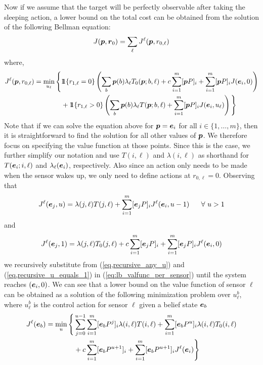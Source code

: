 \documentclass[journal,draftcls,onecolumn,11pt]{IEEEtran}
\newcommand{\emb}[1]{\text{\boldmath{$#1$}}}
\newcommand{\indic}[1]{\mbox{$1\!\!1$}{\{#1\}}}
\begin{document}
Now if we assume that the target will be perfectly observable after taking the sleeping action, a lower bound on the total cost can be obtained from the solution of the following Bellman equation:
\begin{equation}
J(\emb{p},\emb{r}_0) = \sum_{\ell} J^{\ell}(\emb{p},r_{0,\ell})
\label{eq,decomposed_valfunc}
\end{equation}
where,
\begin{align}
J^{\ell}(\emb{p},r_{0,\ell})=\min_{u_{\ell}}\Bigg\{&\indic{r_{1,\ell}=0}\left(\sum_b \emb{p}(b)\lambda_{\ell}T_0(\emb{p};b,\ell)+c\sum_{i=1}^m [\emb{p}P]_i + \sum_{i=1}^m [\emb{p}P]_i J(\emb{e}_i,0)\right)\nonumber\\
&+\indic{r_{1,\ell}>0}\left(\sum_b \emb{p}(b)\lambda_{\ell}T(\emb{p};b,\ell)+\sum_{i=1}^m [\emb{p}P]_i J(\emb{e}_i,u_{\ell})\right)\Bigg\}
\label{eq:lb_valfunc_per_sensor}
\end{align}
Note that if we can solve the equation above for $\emb{p}=\emb{e}_i$ for all $i\in\{1,\ldots,m\}$, then it is straightforward to find the solution for all other values of $\emb{p}$. We therefore focus on specifying the value function at those points. Since this is the case, we further simplify our notation and use $T(i,\ell)$ and $\lambda(i,\ell)$ as shorthand for $T(\emb{e}_i;i,\ell)$ and $\lambda_{\ell}(\emb{e}_i)$, respectively. Also since an action only needs to be made when the sensor wakes up, we only need to define actions at $r_{0,\ell}=0$. Observing that
\begin{eqnarray}
J^{\ell}(\emb{e}_j,u)= \lambda(j,\ell)T(j,\ell)+ \sum_{i=1}^m [\emb{e}_jP]_i J^{\ell}(\emb{e}_i,u-1)~~~~~\forall~u>1
\label{eq,recursive_any_u}
\end{eqnarray}
and
\begin{eqnarray}
J^{\ell}(\emb{e}_j,1)= \lambda(j,\ell)T_0(j,\ell)+ c\sum_{i=1}^m [\emb{e}_jP]_i+\sum_{i=1}^m [\emb{e}_jP]_i J^{\ell}(\emb{e}_i,0)
\label{eq,recursive_u_equals_1}
\end{eqnarray}
we recursively substitute from (\ref{eq,recursive_any_u}) and (\ref{eq,recursive_u_equals_1}) in (\ref{eq:lb_valfunc_per_sensor}) until the system reaches $(\emb{e}_i,0)$. We can see that a lower bound on the value function of sensor $\ell$ can be obtained as a solution of the following minimization problem over $u_{\ell}^b$, where $u_{\ell}^b$ is the control action for sensor $\ell$ given a belief state $\emb{e}_b$
\begin{align}
J^{\ell}(\emb{e}_b) = \min_u \Bigg\{&\sum_{j=0}^{u-1}\sum_{i=1}^m [\emb{e}_bP^j]_i \lambda(i,\ell)T(i,\ell)+\sum_{i=1}^m [\emb{e}_b P^u]_i \lambda(i,\ell)T_0(i,\ell)\nonumber\\
&+ c\sum_{i=1}^m [\emb{e}_bP^{u+1}]_i+\sum_{i=1}^m [\emb{e}_bP^{u+1}]_i J^{\ell}(\emb{e}_i)\Bigg\}
\label{eq,final_lb_per_sensor}
\end{align}
\end{document}
